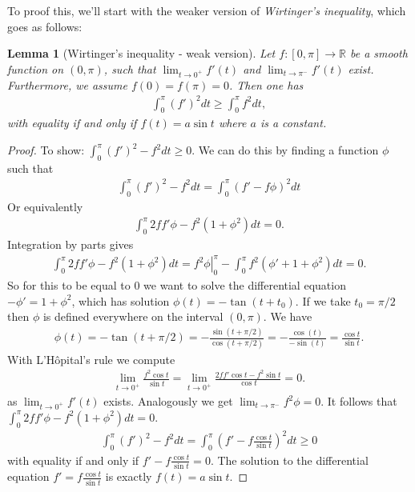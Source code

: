 \documentclass[12pt, a4paper, titlepage]{article}
\newtheorem{lemma}{Lemma}
\begin{document}
To proof this, we'll start with the weaker version of \textit{Wirtinger's inequality}, which goes as follows:

\begin{lemma}[Wirtinger's inequality - weak version] Let $ f: [0,\pi] \rightarrow \mathbb{R} $ be a smooth function on $(0,\pi)$, such that $\lim_{t\rightarrow 0^+}f'(t)$ and $\lim_{t\rightarrow \pi ^-}f'(t)$ exist. Furthermore, we assume $f(0) = f(\pi) = 0$. Then one has
\begin{align*}
\int_{0}^{\pi}(f')^2dt \geq \int_{0}^{\pi}f^2dt,
\end{align*}
with equality if and only if $f(t) = a\sin t$ where $a$ is a constant.
\end{lemma}

\begin{proof}
To show: $\int_{0}^{\pi}(f')^2-f^2dt \geq 0$.
We can do this by finding a function $\phi$ such that
\begin{align*}
\int_{0}^{\pi}(f')^2-f^2dt = \int_{0}^{\pi}(f'-f\phi)^2dt
\end{align*}
Or equivalently
\begin{align*}
\int_{0}^{\pi}2ff'\phi - f^2(1+\phi^2)dt = 0.
\end{align*}
Integration by parts gives
\begin{align*}
\int_{0}^{\pi}2ff'\phi - f^2(1+\phi^2)dt =  \left.f^2\phi\right|^{\pi}_0 - \int_{0}^{\pi}f^2(\phi'+1+\phi^2)dt = 0.
\end{align*}
So for this to be equal to $0$ we want to solve the differential equation $-\phi' = 1 + \phi^2$, which has solution $\phi(t) = -\tan(t + t_0)$. If we take $t_0 = \pi/2$ then $\phi$ is defined everywhere on the interval $(0,\pi)$. We have 
\begin{align*}
\phi(t) = -\tan(t + \pi/2) = -\frac{\sin(t+\pi/2)}{\cos(t+\pi/2)} = -\frac{\cos(t)}{-\sin(t)} = \frac{\cos t}{\sin t}.
\end{align*}
With L'H\^opital's rule we compute
\begin{align*}
\lim_{t\rightarrow 0^+}\frac{f^2\cos t}{\sin t} = \lim_{t\rightarrow 0^+}\frac{2ff'\cos t - f^2 \sin t}{\cos t} = 0.
\end{align*}
as $\lim_{t\rightarrow 0^+}f'(t)$ exists. Analogously we get $\lim_{t\rightarrow \pi ^-}f^2\phi = 0$. It follows that $\int_{0}^{\pi}2ff'\phi - f^2(1+\phi^2)dt = 0$.
\begin{align*}
\int_{0}^{\pi}(f')^2-f^2dt = \int_{0}^{\pi}\left(f'-f\frac{\cos t}{\sin t}\right)^2 dt \geq 0
\end{align*}
with equality if and only if $f'-f\frac{\cos t}{\sin t} = 0$. The solution to the differential equation $f' = f\frac{\cos t}{\sin t}$ is exactly $f(t) = a\sin t$.
\end{proof}
\end{document}
